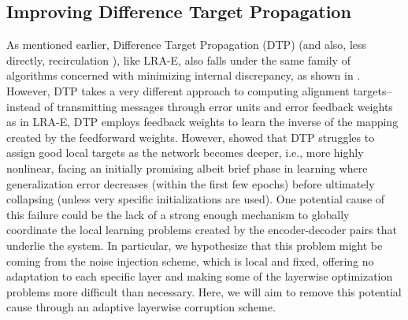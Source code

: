 \documentclass[letterpaper]{article} %
\begin{document}


\subsection{Improving Difference Target Propagation}
\label{sec:dtp_sigma}
As mentioned earlier, Difference Target Propagation (DTP) (and also, less directly, recirculation \cite{hinton1988learning,o1996biologically}), like LRA-E, also falls under the same family of algorithms concerned with minimizing internal discrepancy, as shown in \cite{ororbia2017learning,ororbia2018conducting}. However, DTP takes a very different approach to computing alignment targets--instead of transmitting messages through error units and error feedback weights as in LRA-E, DTP employs feedback weights to learn the inverse of the mapping created by the feedforward weights. 
However, \cite{ororbia2018conducting} showed that DTP struggles to assign good local targets as the network becomes deeper, i.e., more highly nonlinear, facing an initially promising albeit brief phase in learning where generalization error decreases (within the first few epochs) before ultimately collapsing (unless very specific initializations are used). One potential cause of this failure could be the lack of a strong enough mechanism to globally coordinate the local learning problems created by the encoder-decoder pairs that underlie the system. In particular, we hypothesize that this problem might be coming from the noise injection scheme, which is local and fixed, offering no adaptation to each specific layer and making some of the layerwise optimization problems more difficult than necessary. Here, we will aim to remove this potential cause through an adaptive layerwise corruption scheme.
\end{document}
